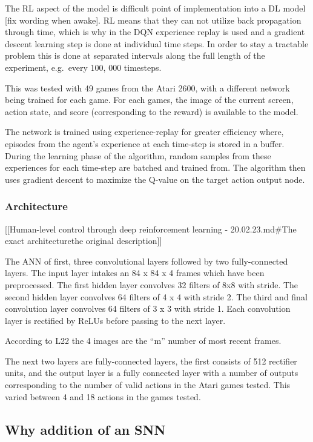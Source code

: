 The RL aspect of the model is difficult point of implementation into a
DL model {[}fix wording when awake{]}. RL means that they can not
utilize back propagation through time, which is why in the DQN
experience replay is used and a gradient descent learning step is done
at individual time steps. In order to stay a tractable problem this is
done at separated intervals along the full length of the experiment,
e.g.~every 100, 000 timesteps.

This was tested with 49 games from the Atari 2600, with a different
network being trained for each game. For each games, the image of the
current screen, action state, and score (corresponding to the reward) is
available to the model.

The network is trained using experience-replay for greater efficiency
where, episodes from the agent's experience at each time-step is stored
in a buffer. During the learning phase of the algorithm, random samples
from these experiences for each time-step are batched and trained from.
The algorithm then uses gradient descent to maximize the Q-value on the
target action output node.

\hypertarget{architecture}{%
\subsubsection{Architecture}\label{architecture}}

{[}{[}Human-level control through deep reinforcement learning -
20.02.23.md\#The exact architecture\textbar the original
description{]}{]}

The ANN of first, three convolutional layers followed by two
fully-connected layers. The input layer intakes an 84 x 84 x 4 frames
which have been preprocessed. The first hidden layer convolves 32
filters of 8x8 with stride. The second hidden layer convolves 64 filters
of 4 x 4 with stride 2. The third and final convolution layer convolves
64 filters of 3 x 3 with stride 1. Each convolution layer is rectified
by ReLUs before passing to the next layer.

According to L22 the 4 images are the ``m'' number of most recent
frames.

The next two layers are fully-connected layers, the first consists of
512 rectifier units, and the output layer is a fully connected layer
with a number of outputs corresponding to the number of valid actions in
the Atari games tested. This varied between 4 and 18 actions in the
games tested.

\hypertarget{why-addition-of-an-snn}{%
\subsection{Why addition of an SNN}\label{why-addition-of-an-snn}}

